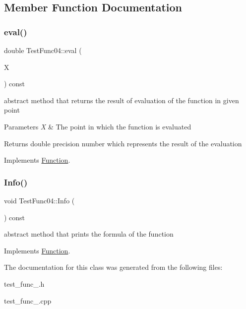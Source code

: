 \subsection{Member Function Documentation}
\mbox{\label{class_test_func04_a8c4666904611a414b985d17661847ec7}} 
\subsubsection{\texorpdfstring{eval()}{eval()}}
{\footnotesize\ttfamily double Test\+Func04\+::eval (\begin{DoxyParamCaption}\item[{const \hyperlink{classv_point}{v\+Point} \&}]{X }\end{DoxyParamCaption}) const\hspace{0.3cm}{\ttfamily [virtual]}}

abstract method that returns the result of evaluation of the function in given point 
\begin{DoxyParams}{Parameters}
{\em X} & The point in which the function is evaluated \\
\hline
\end{DoxyParams}
\begin{DoxyReturn}{Returns}
double precision number which represents the result of the evaluation 
\end{DoxyReturn}


Implements \hyperlink{class_function_a8b9d55271a531b6f5bef09bfae0a23d9}{Function}.

\mbox{\label{class_test_func04_a7c2bf8c334c926cbfa464081e33ac30f}} 
\subsubsection{\texorpdfstring{Info()}{Info()}}
{\footnotesize\ttfamily void Test\+Func04\+::\+Info (\begin{DoxyParamCaption}{ }\end{DoxyParamCaption}) const\hspace{0.3cm}{\ttfamily [virtual]}}

abstract method that prints the formula of the function 

Implements \hyperlink{class_function_a6915be18a065224ed73b1288c6125948}{Function}.



The documentation for this class was generated from the following files\+:\begin{DoxyCompactItemize}
\item 
test\+\_\+func\+\_.\+h\item 
test\+\_\+func\+\_.\+cpp\end{DoxyCompactItemize}

